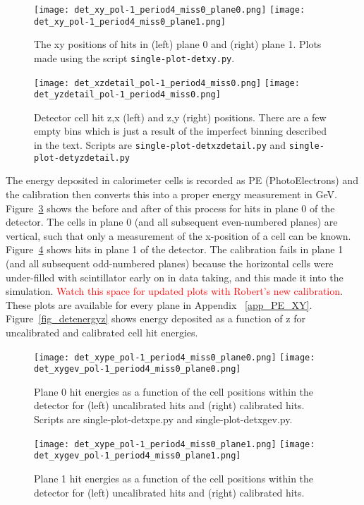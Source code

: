  \begin{figure}	   
 \centering
        	\texttt{[image: det\_xy\_pol-1\_period4\_miss0\_plane0.png]}
	\texttt{[image: det\_xy\_pol-1\_period4\_miss0\_plane1.png]}
		 \caption{The xy positions of hits in (left) plane 0 and (right) plane 1. Plots made using the script \texttt{single-plot-detxy.py}.}	
   \label{fig_dethit_plane01}
  \end{figure}

 \begin{figure}	   
 \centering
  \texttt{[image: det\_xzdetail\_pol-1\_period4\_miss0.png]}
   \texttt{[image: det\_yzdetail\_pol-1\_period4\_miss0.png]}
  \caption{Detector cell hit z,x (left) and z,y (right) positions. There are a few empty bins which is just a result of the imperfect binning described in the text.
  Scripts are \texttt{single-plot-detxzdetail.py} and \texttt{single-plot-detyzdetail.py}  }			
   \label{fig_detxz}
  \end{figure}
  
  

\noindent
The energy deposited in calorimeter cells is recorded as PE (PhotoElectrons) and the calibration then converts this into a proper energy measurement in GeV. Figure~\ref{fig_calibhits0} shows the before and after of this process for hits in plane 0 of the detector. The cells in plane 0 (and all subsequent even-numbered planes) are vertical, such that only a measurement of the x-position of a cell can be known. Figure~\ref{fig_calibhits1} shows hits in plane 1 of the detector.  The calibration fails in plane 1 (and all subsequent odd-numbered planes) because the horizontal cells were under-filled with scintillator early on in data taking, and this made it into the simulation. \textcolor{red}{Watch this space for updated plots with Robert's new calibration}.  These plots are available for every plane in Appendix ~\ref{app_PE_XY}.  Figure~\ref{fig_detenergyz} shows energy deposited as a function of z for uncalibrated and calibrated cell hit energies. 


 \begin{figure}	   
 \centering
  \texttt{[image: det\_xype\_pol-1\_period4\_miss0\_plane0.png]}
   \texttt{[image: det\_xygev\_pol-1\_period4\_miss0\_plane0.png]}
  \caption{Plane 0 hit energies as a function of the cell positions within the detector for (left) uncalibrated hits and (right) calibrated hits. Scripts are single-plot-detxpe.py and single-plot-detxgev.py.}			
   \label{fig_calibhits0}
  \end{figure}
%
%  
% 
% 
  \begin{figure}	   
 \centering
  \texttt{[image: det\_xype\_pol-1\_period4\_miss0\_plane1.png]}
   \texttt{[image: det\_xygev\_pol-1\_period4\_miss0\_plane1.png]}
  \caption{Plane 1 hit energies as a function of the cell positions within the detector for (left) uncalibrated hits and (right) calibrated hits.}			
   \label{fig_calibhits1}
  \end{figure}


